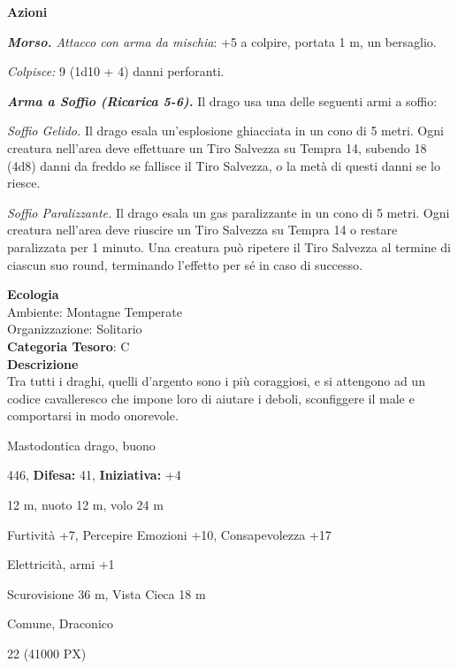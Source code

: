 \begin{multicols}{2}
{\textbf{Azioni}

\emph{\textbf{Morso.} Attacco con arma da mischia}: +5 a colpire, portata 1 m, un bersaglio.

\emph{Colpisce:} 9 (1d10 + 4) danni perforanti.

\emph{\textbf{Arma a Soffio (Ricarica 5-6).}} Il drago usa una delle seguenti armi a soffio:

\emph{Soffio Gelido.} Il drago esala un'esplosione ghiacciata in un cono di 5 metri. Ogni creatura nell'area deve effettuare un Tiro Salvezza su Tempra 14, subendo 18 (4d8) danni da freddo se fallisce il Tiro Salvezza, o la metà di questi danni se lo riesce.

\emph{Soffio Paralizzante.} Il drago esala un gas paralizzante in un cono di 5 metri. Ogni creatura nell'area deve riuscire un Tiro Salvezza su Tempra 14 o restare paralizzata per 1 minuto. Una creatura può ripetere il Tiro Salvezza al termine di ciascun suo round, terminando l'effetto per sé in caso di successo.

\textbf{Ecologia}\\
Ambiente: Montagne Temperate\\
Organizzazione: Solitario\\
\textbf{Categoria Tesoro}: C\\
\textbf{Descrizione}\\
Tra tutti i draghi, quelli d'argento sono i più coraggiosi, e si attengono ad un codice cavalleresco che impone loro di aiutare i deboli, sconfiggere il male e comportarsi in modo onorevole.

\noindent
\begin{description}[noitemsep, topsep=0pt, parsep=0pt, partopsep=0pt, leftmargin=0cm, labelwidth=2.2cm]
	\item[\textbf{Taglia/Tipo:}] Mastodontica drago, buono
	\item[\textbf{Caratt.:}] 
	\item[\textbf{Punti Ferita:}] 446,  \textbf{Difesa:} 41,  \textbf{Iniziativa:} +4
	\item[\textbf{Movimento:}] 12 m, nuoto 12 m, volo 24 m
	\item[\textbf{Tiri Salvez.:}] 
	\item[\textbf{Comp.:}] Furtività +7, Percepire Emozioni +10, Consapevolezza +17
	\item[\textbf{Imm. Danni:}] Elettricità, armi +1
	\item[\textbf{Sensi:}] Scurovisione 36 m, Vista Cieca 18 m
	\item[\textbf{Linguaggi:}] Comune, Draconico
	\item[\textbf{Sfida:}] 22 (41000 PX)\smallskip
\end{description}

}
\end{multicols}
